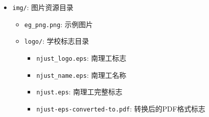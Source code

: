 \begin{itemize}
\item \texttt{img/}: 图片资源目录
    \begin{itemize}
        \item \texttt{eg\_png.png}: 示例图片
        \item \texttt{logo/}: 学校标志目录
            \begin{itemize}
                \item \texttt{njust\_logo.eps}: 南理工标志
                \item \texttt{njust\_name.eps}: 南理工名称
                \item \texttt{njust.eps}: 南理工完整标志
                \item \texttt{njust-eps-converted-to.pdf}: 转换后的PDF格式标志
            \end{itemize}
    \end{itemize}

\end{itemize}




